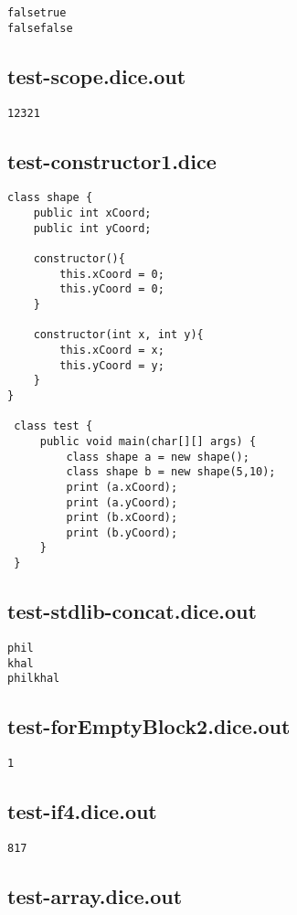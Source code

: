 \begin{verbatim}
falsetrue
falsefalse
\end{verbatim}\pagebreak\subsection{test-scope.dice.out}
\begin{verbatim}
12321
\end{verbatim}\pagebreak\subsection{test-constructor1.dice}
\begin{verbatim}
class shape {
	public int xCoord;
	public int yCoord;
	
	constructor(){
		this.xCoord = 0;
		this.yCoord = 0;
	}

	constructor(int x, int y){
		this.xCoord = x;
		this.yCoord = y;
	}
}

 class test {
	 public void main(char[][] args) {
		 class shape a = new shape();
		 class shape b = new shape(5,10);
		 print (a.xCoord);
		 print (a.yCoord);
		 print (b.xCoord);
		 print (b.yCoord);
	 }
 }
\end{verbatim}\pagebreak\subsection{test-stdlib-concat.dice.out}
\begin{verbatim}
phil
khal
philkhal

\end{verbatim}\pagebreak\subsection{test-forEmptyBlock2.dice.out}
\begin{verbatim}
1
\end{verbatim}\pagebreak\subsection{test-if4.dice.out}
\begin{verbatim}
817
\end{verbatim}\pagebreak\subsection{test-array.dice.out}
